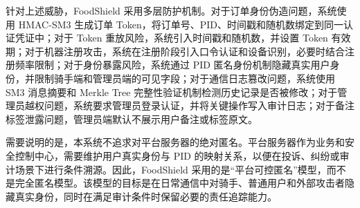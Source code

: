 针对上述威胁，FoodShield 采用多层防护机制。对于订单身份伪造问题，系统使用 HMAC-SM3 生成订单 Token，将订单号、PID、时间戳和随机数绑定到同一认证凭证中；对于 Token 重放风险，系统引入时间戳和随机数，并设置 Token 有效期；对于机器注册攻击，系统在注册阶段引入口令认证和设备识别，必要时结合注册频率限制；对于身份暴露风险，系统通过 PID 匿名身份机制隐藏真实用户身份，并限制骑手端和管理员端的可见字段；对于通信日志篡改问题，系统使用 SM3 消息摘要和 Merkle Tree 完整性验证机制检测历史记录是否被修改；对于管理员越权问题，系统要求管理员登录认证，并将关键操作写入审计日志；对于备注标签泄露问题，管理员端默认不展示用户备注或标签原文。

需要说明的是，本系统不追求对平台服务器的绝对匿名。平台服务器作为业务和安全控制中心，需要维护用户真实身份与 PID 的映射关系，以便在投诉、纠纷或审计场景下进行条件溯源。因此，FoodShield 采用的是“平台可控匿名”模型，而不是完全匿名模型。该模型的目标是在日常通信中对骑手、普通用户和外部攻击者隐藏真实身份，同时在满足审计条件时保留必要的责任追踪能力。
